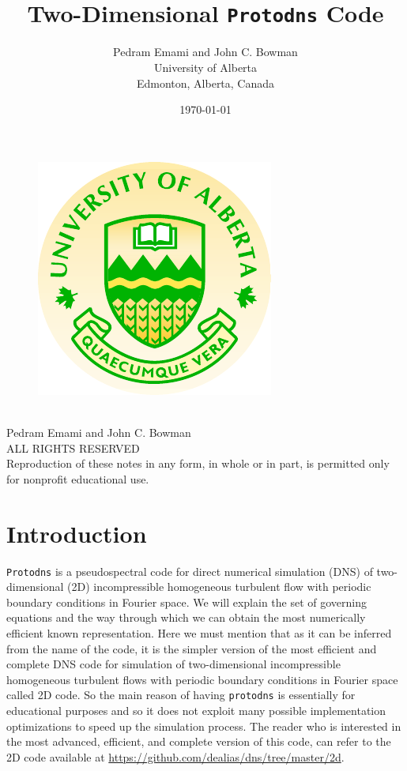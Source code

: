 \documentclass[12pt]{article}
\title{\huge{\textbf{\\Two-Dimensional {\tt Protodns} Code}}}
\author{Pedram Emami and John C. Bowman\\University of Alberta\\Edmonton,
  Alberta, Canada}
\date{\today}
\begin{document}
\maketitle

\thispagestyle{empty}
\begin{figure}[h]
\centering
\includegraphics{uofa}
\end{figure}
\newpage
\thispagestyle{empty}
\begin{center}
\ \vspace{20cm}\\
Pedram Emami and John C. Bowman\\
ALL RIGHTS RESERVED\\
Reproduction of these notes in any form, in whole or in part, is permitted only for nonprofit educational use.
\end{center}
\newpage
\setcounter{page}{1}
\section{Introduction}
{\tt Protodns} is a pseudospectral code for
direct numerical simulation (DNS) of two-dimensional (2D) incompressible homogeneous
  turbulent flow with periodic boundary conditions in Fourier space. We
  will explain the set of governing equations and the way through which we
  can obtain the most numerically efficient known representation.
Here we must mention that as it can be inferred from the name of the code, it is the simpler version of the most efficient and complete DNS code for simulation of two-dimensional incompressible homogeneous turbulent flows with periodic boundary conditions in Fourier space called 2D code. So the main reason of having {\tt protodns} is essentially for educational purposes and so it does not exploit many possible implementation optimizations to speed up the simulation process. The reader who is interested in the most advanced, efficient, and complete version of this code, can refer to the 2D code available at \url{https://github.com/dealias/dns/tree/master/2d}.
%
\end{document}
